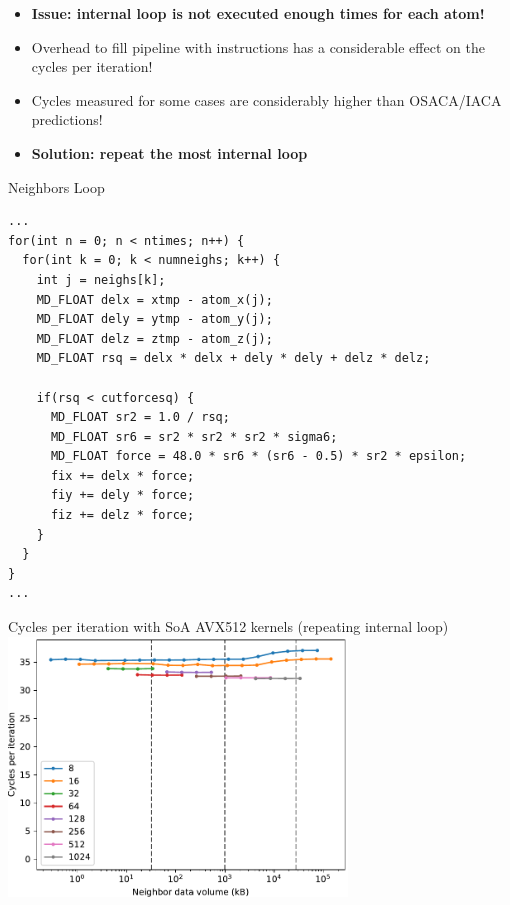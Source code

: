 \documentclass[aspectratio=169,t]{beamer}
\begin{document}
  \begin{frame}[fragile]{}
    \begin{itemize}
      \item \textbf{Issue: internal loop is not executed enough times for each atom!}
      \item Overhead to fill pipeline with instructions has a considerable effect on the cycles per iteration!
      \item Cycles measured for some cases are considerably higher than OSACA/IACA predictions!
      \item \textbf{Solution: repeat the most internal loop}
    \end{itemize}
  \end{frame}

  \begin{frame}[fragile]{Neighbors Loop}
    \begin{lstlisting}
...
for(int n = 0; n < ntimes; n++) {
  for(int k = 0; k < numneighs; k++) {
    int j = neighs[k];
    MD_FLOAT delx = xtmp - atom_x(j);
    MD_FLOAT dely = ytmp - atom_y(j);
    MD_FLOAT delz = ztmp - atom_z(j);
    MD_FLOAT rsq = delx * delx + dely * dely + delz * delz;

    if(rsq < cutforcesq) {
      MD_FLOAT sr2 = 1.0 / rsq;
      MD_FLOAT sr6 = sr2 * sr2 * sr2 * sigma6;
      MD_FLOAT force = 48.0 * sr6 * (sr6 - 0.5) * sr2 * epsilon;
      fix += delx * force;
      fiy += dely * force;
      fiz += delz * force;
    }
  }
}
...
    \end{lstlisting}
  \end{frame}

  \begin{frame}[fragile]{Cycles per iteration with SoA AVX512 kernels (repeating internal loop)}
    \includegraphics[width=9cm]{results_soa_casclakesp2_rep_neighbor_vol.pdf}
  \end{frame}
\end{document}
